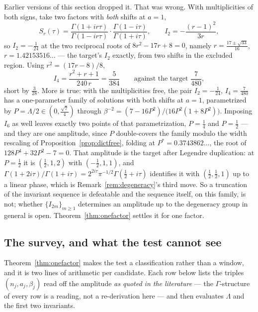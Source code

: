 \begin{remark}\label{rem:retraction}
Earlier versions of this section dropped it. That was wrong. With multiplicities
of both signs, take two factors with \emph{both} shifts at $a=1$,
\[
 S_r(\tau)=\frac{\Gamma(1+ir\tau)}{\Gamma(1-ir\tau)}\cdot
 \frac{\Gamma(1-i\tau)}{\Gamma(1+i\tau)},\qquad
 I_2=-\frac{(r-1)^2}{3r},
\]
so $I_2=-\frac1{24}$ at the two reciprocal roots of $8r^2-17r+8=0$, namely
$r=\frac{17\pm\sqrt{33}}{16}$, $r=1.42153516\ldots$ --- the target's $I_2$
exactly, from two shifts in the excluded region. Using $r^2=(17r-8)/8$,
\[
 I_4=\frac{r^2+r+1}{240\,r}=\frac5{384}
 \qquad\text{against the target }\frac7{480},
\]
short by $\frac3{28}$. More is true: with the multiplicities free, the pair
$I_2=-\frac1{24}$, $I_4=\frac7{480}$ has a one-parameter family of solutions with
both shifts at $a=1$, parametrized by $P=\Lambda/2\in(0,\frac{\sqrt7}4)$ through
$\beta^{-2}=(7-16P^2)/\big(16P^2(1+8P^2)\big)$. Imposing $I_6$ as well leaves
exactly two points of that parametrization, $P=\frac14$ and $P=\frac12$ --- and
they are one amplitude, since $P$ double-covers the family modulo the width
rescaling of Proposition~\ref{prop:dictfree}, folding at
$P^\ast=0.3743862\ldots$, the root of $128P^4+32P^2-7=0$. That amplitude is the
target after Legendre duplication: at $P=\frac12$ it is
$(\frac12,1,2)$ with $(-\frac12,1,1)$, and
$\Gamma(1+2i\tau)/\Gamma(1+i\tau)=2^{2i\tau}\pi^{-1/2}\Gamma(\frac12+i\tau)$
identifies it with $(\frac12,\frac12,1)$ up to a linear phase, which is
Remark~\ref{rem:degeneracy}'s third move. So a truncation of the invariant
sequence is defeatable and the sequence itself, on this family, is not; whether
$\{I_{2m}\}_{m\geq1}$ determines an amplitude up to the degeneracy group in
general is open. Theorem~\ref{thm:onefactor} settles it for one factor.
\end{remark}

\subsection{The survey, and what the test cannot see}\label{ssec:survey}

Theorem~\ref{thm:onefactor} makes the test a classification rather than a window,
and it is two lines of arithmetic per candidate. Each row below lists the triples
$(n_j,a_j,\beta_j)$ read off the amplitude \emph{as quoted in the literature} ---
the $\Gamma$-structure of every row is a reading, not a re-derivation here --- and
then evaluates $\Lambda$ and the first two invariants.


